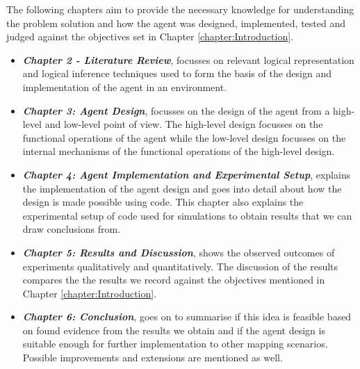 The following chapters aim to provide the necessary knowledge for understanding the problem solution and how the agent was designed, implemented, tested and judged against the objectives set in Chapter \ref{chapter:Introduction}. 

\begin{itemize}
	

	\item \textbf{\textit{Chapter 2 -  Literature Review}}, focusses on relevant logical representation and logical inference techniques used to form the basis of the design and implementation of the agent in an environment.

	\item \textbf{\textit{Chapter 3: Agent Design}}, focusses on the design of the agent from a high-level and low-level point of view. The high-level design focusses on the functional operations of the agent while the low-level design focusses on the internal mechanisms of the functional operations of the high-level design.
	
	\item \textbf{\textit{Chapter 4: Agent Implementation and Experimental Setup}}, explains the implementation of the agent design and goes into detail about how the design is made possible using code. This chapter also explains the experimental setup of code used for simulations to obtain results that we can draw conclusions from. 
	
	\item \textbf{\textit{Chapter 5: Results and Discussion}}, shows the observed outcomes of experiments qualitatively and quantitatively. The discussion of the results compares the the results we record against the objectives mentioned in Chapter \ref{chapter:Introduction}.
	
	\item \textbf{\textit{Chapter 6: Conclusion}}, goes on to summarise if this idea is feasible based on found evidence from the results we obtain and if the agent design is suitable enough for further implementation to other mapping scenarios. Possible improvements and extensions are mentioned as well.
\end{itemize}
















